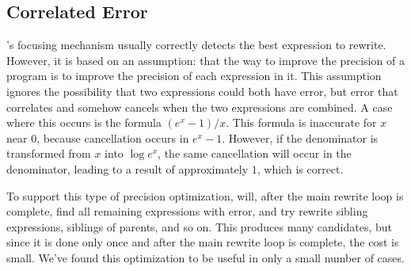 \documentclass[paper.tex]{subfiles}
\begin{document}
\subsection{Correlated Error}

\casio's focusing mechanism usually correctly detects
  the best expression to rewrite.
However, it is based on an assumption:
  that the way to improve the precision of a program
  is to improve the precision of each expression in it.
This assumption ignores the possibility
  that two expressions could both have error,
  but error that correlates and somehow cancels
  when the two expressions are combined.
A case where this occurs is the formula $(e^x - 1) / x$.
This formula is inaccurate for $x$ near $0$,
  because cancellation occurs in $e^x - 1$.
However, if the denominator is transformed from $x$ into $\log e^x$,
  the same cancellation will occur in the denominator,
  leading to a result of approximately $1$, which is correct.

To support this type of precision optimization,
  \casio will, after the main rewrite loop is complete,
  find all remaining expressions with error,
  and try rewrite sibling expressions, siblings of parents, and so on.
This produces many candidates, but since it is done only once
  and after the main rewrite loop is complete, the cost is small.
We've found this optimization to be useful in only a small number of cases.
\end{document}
